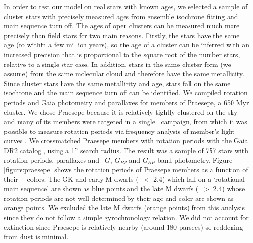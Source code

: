 In order to test our model on real stars with known ages, we selected a sample
of cluster stars with precisely measured ages from ensemble isochrone fitting
and main sequence turn off.
The ages of open clusters can be measured much more precisely than field
stars for two main reasons.
Firstly, the stars have the same age (to within a few million years), so the
age of a cluster can be inferred with an increased precision that is
proportional to the square root of the number stars, relative to a single star
case.
In addition, stars in the same cluster form (we assume) from the same
molecular cloud and therefore have the same metallicity.
Since cluster stars have the same metallicity and age, stars fall on the same
isochrone and the main sequence turn
off can be identified.
We compiled rotation periods and Gaia photometry and parallaxes for members of
Praesepe, a 650 Myr cluster.
We chose Praesepe because it is relatively tightly clustered on the sky and
many of its members were targeted in a single \ktwo\ campaign, from which it
was possible to measure rotation periods via frequency analysis of member's
light curves \citep{douglas2017}.
We crossmatched Praesepe members with rotation periods \citep{douglas2017}
with the Gaia DR2 catalog \citep{brown2018}, using a 1'' search radius.
The result was a sample of 757 stars with rotation periods, parallaxes and
\gaia\ $G$, $G_{BP}$ and $G_{RP}$-band photometry.
Figure \ref{figure:praesepe} shows the rotation periods of Praesepe members as
a function of their \gaia\ \gcolor\ colors.
The GK and early M dwarfs (\gcolor\ $<$ 2.4) which fall on a `rotational main
sequence' are shown as blue points and the late M dwarfs (\gcolor\ $>$ 2.4)
whose rotation periods are not well determined by their age and color are
shown as orange points.
We excluded the late M dwarfs (orange points) from this analysis since they do
not follow a simple gyrochronology relation.
We did not account for extinction since Praesepe is relatively nearby (around
180 parsecs) so reddening from dust is minimal.


